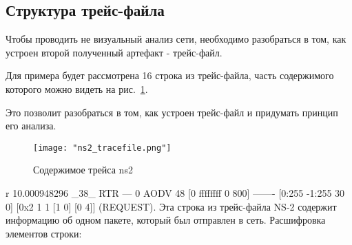 \subsection*{Структура трейс-файла}

Чтобы проводить не визуальный анализ сети, необходимо разобраться в том, как устроен второй полученный артефакт - трейс-файл.

Для примера будет рассмотрена 16 строка из трейс-файла, часть содержимого которого можно видеть на рис.~\ref{fig:ns2_tracefile}.

Это позволит разобраться в том, как устроен трейс-файл и придумать принцип его анализа.

\begin{figure}[!h]
  \centering
  \texttt{[image: "ns2\_tracefile.png"]}
  \caption{Содержимое трейса ns2}
  \label{fig:ns2_tracefile}
\end{figure}

r 10.000948296 \_38\_ RTR  --- 0 AODV 48 [0 ffffffff 0 800] ------- [0:255 -1:255 30 0] [0x2 1 1 [1 0] [0 4]] (REQUEST). Эта строка из трейс-файла NS-2 содержит информацию об одном пакете, который был отправлен в сеть. 
Расшифровка элементов строки:

